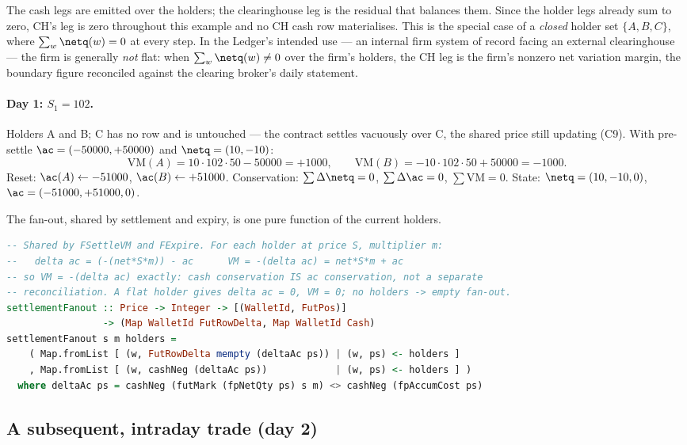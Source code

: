 \documentclass[11pt,a4paper]{article}
\begin{document}
\noindent The cash legs are emitted over the holders; the clearinghouse leg is the residual that
balances them. Since the holder legs already sum to zero, CH's leg is zero throughout this example and
no CH cash row materialises. This is the special case of a \emph{closed} holder set $\{A,B,C\}$, where
$\sum_w\netq(w)=0$ at every step. In the Ledger's intended use --- an internal firm system of record
facing an external clearinghouse --- the firm is generally \emph{not} flat: when $\sum_w\netq(w)\ne 0$
over the firm's holders, the CH leg is the firm's nonzero net variation margin, the boundary figure
reconciled against the clearing broker's daily statement.

\paragraph{Day 1: $S_1=102$.} Holders A and B; C has no row and is untouched --- the contract settles
vacuously over C, the shared price still updating (C9). With pre-settle $\ac=(-50000,+50000)$ and
$\netq=(10,-10)$:
\[
\mathrm{VM}(A) = 10\cdot 102\cdot 50 - 50000 = +1000,\qquad
\mathrm{VM}(B) = -10\cdot 102\cdot 50 + 50000 = -1000.
\]
Reset: $\ac(A)\leftarrow -51000$, $\ac(B)\leftarrow +51000$. Conservation: $\sum\Delta\netq=0$,
$\sum\Delta\ac = 0$, $\sum\mathrm{VM}=0$. State: $\netq=(10,-10,0)$, $\ac=(-51000,+51000,0)$.

The fan-out, shared by settlement and expiry, is one pure function of the current holders.

\begin{lstlisting}[language=Haskell]
-- Shared by FSettleVM and FExpire. For each holder at price S, multiplier m:
--   delta ac = (-(net*S*m)) - ac      VM = -(delta ac) = net*S*m + ac
-- so VM = -(delta ac) exactly: cash conservation IS ac conservation, not a separate
-- reconciliation. A flat holder gives delta ac = 0, VM = 0; no holders -> empty fan-out.
settlementFanout :: Price -> Integer -> [(WalletId, FutPos)]
                 -> (Map WalletId FutRowDelta, Map WalletId Cash)
settlementFanout s m holders =
    ( Map.fromList [ (w, FutRowDelta mempty (deltaAc ps)) | (w, ps) <- holders ]
    , Map.fromList [ (w, cashNeg (deltaAc ps))            | (w, ps) <- holders ] )
  where deltaAc ps = cashNeg (futMark (fpNetQty ps) s m) <> cashNeg (fpAccumCost ps)
\end{lstlisting}

\subsection{A subsequent, intraday trade (day 2)}
\end{document}
